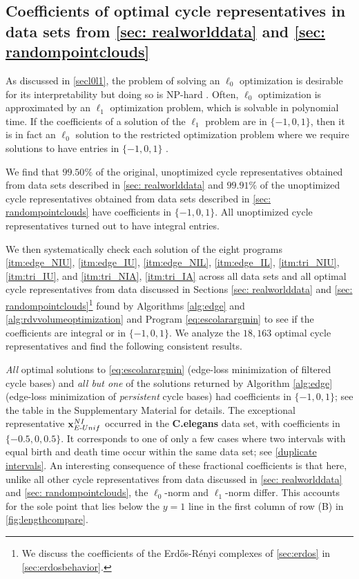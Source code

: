 \subsection{Coefficients of optimal cycle representatives in data sets from \se \ref{sec: realworlddata} and \se \ref{sec: randompointclouds}}
\label{coefficient}
As discussed in \se \ref{secl0l1}, the problem of solving an $\ell_0$ optimization is desirable for its interpretability but doing so is NP-hard \cite{NPhardL0}. Often, $\ell_0$ optimization is approximated by an $\ell_1$ optimization problem, which is solvable in polynomial time. If the coefficients of a solution of the $\ell_1$ problem are in $\{-1,0,1\}$, then it is in fact an $\ell_0$ solution to the restricted optimization problem where we require solutions to have entries in $\{-1, 0, 1\}$ \cite{Escolar2016, Obayashi2018}. 

We find that $99.50\%$ of the original, unoptimized cycle representatives obtained from data sets described in \se \ref{sec: realworlddata} and $99.91\%$ of the unoptimized cycle representatives obtained from data sets described in \se \ref{sec: randompointclouds} have coefficients in $\{-1,0,1\}$. All unoptimized cycle representatives turned out to have integral entries.

We then systematically check each solution of the eight programs
\ref{itm:edge_NIU},
\ref{itm:edge_IU},
\ref{itm:edge_NIL},
\ref{itm:edge_IL},
\ref{itm:tri_NIU}, 
\ref{itm:tri_IU}, and
\ref{itm:tri_NIA}, 
\ref{itm:tri_IA}
 across all data sets and all optimal cycle representatives from data discussed in Sections \ref{sec: realworlddata} and \ref{sec: randompointclouds}\footnote{We discuss the coefficients of the Erd\H{o}s-R\'enyi complexes of \se \ref{sec:erdos} in \se \ref{sec:erdosbehavior}.} found by Algorithms \ref{alg:edge} and \ref{alg:rdvvolumeoptimization} and Program \eqref{eq:escolarargmin} to see if the coefficients are integral or in $\{-1,0,1\}$. We analyze the $18{,}163$ optimal cycle representatives and find the following consistent results.
 
 
 \emph{All} optimal solutions to \pr \eqref{eq:escolarargmin} (edge-loss minimization of filtered cycle bases) and \emph{all but one}  of the solutions returned by Algorithm \ref{alg:edge} (edge-loss minimization of \emph{persistent} cycle bases)  had coefficients in $\{-1, 0, 1\}$; see the table in the Supplementary Material for details. The exceptional representative $\mathbf{x}_{E\text{-}Unif}^{NI}$ occurred in the \textbf{C.elegans} data set, with coefficients in $\{-0.5,0,0.5\}$.  It corresponds to one of only a few cases where two intervals with equal birth and death time occur within the same data set; see \se \ref{duplicate intervals}. An interesting consequence of these fractional coefficients is that here, unlike all other cycle representatives from data discussed in \se \ref{sec: realworlddata} and \se \ref{sec: randompointclouds}, the $\ell_0$-norm and $\ell_1$-norm differ.  This accounts for the sole point that lies below the $y=1$ line in the first column of row (B) in \fig \ref{fig:lengthcompare}.

